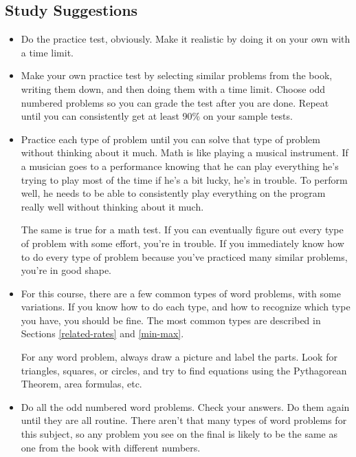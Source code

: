\documentclass[fleqn]{article}
\begin{document}
\subsection{Study Suggestions}
\begin{itemize}
  \item Do the practice test, obviously.  Make it realistic by doing it on your own with a time limit.

  \item Make your own practice test by selecting similar problems from the book, writing them down, and then doing them
    with a time limit.  Choose odd numbered problems so you can grade the test after you are done.  Repeat until you can
    consistently get at least 90\% on your sample tests.

  \item Practice each type of problem until you can solve that type of problem without thinking about it much.  Math is
  like playing a musical instrument.  If a musician goes to a performance knowing that he can play everything he's
  trying to play most of the time if he's a bit lucky, he's in trouble.  To perform well, he needs to be able to
  consistently play everything on the program really well without thinking about it much.

  The same is true for a math test.  If you can eventually figure out every type of problem with some effort, you're in
  trouble.  If you immediately know how to do every type of problem because you've practiced many similar problems,
  you're in good shape.

  \item For this course, there are a few common types of word problems, with some variations.  If you know how to do each type, and
  how to recognize which type you have, you should be fine.  The most common types are described in Sections
  \ref{related-rates} and \ref{min-max}.

  For any word problem, always draw a picture and label the parts.  Look for triangles, squares, or circles, and try to
  find equations using the Pythagorean Theorem, area formulas, etc.

  \item Do all the odd numbered word problems.  Check your answers.  Do them again until they are all routine.  There
    aren't that many types of word problems for this subject, so any problem you see on the final is likely to be the
    same as one from the book with different numbers.  
\end{itemize}
\end{document}

